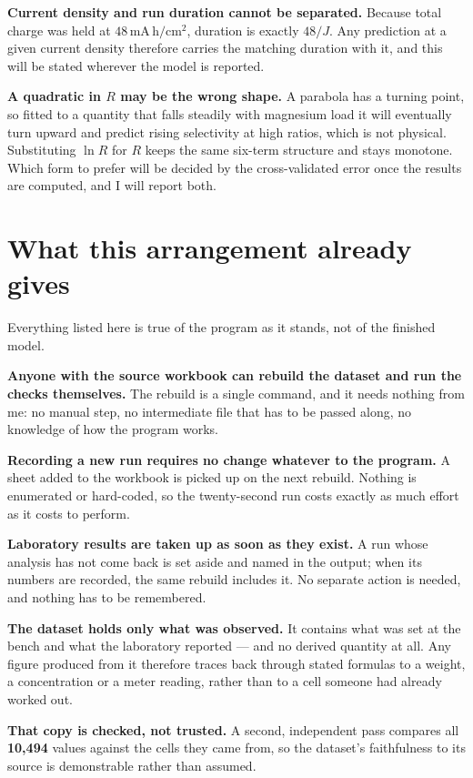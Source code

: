 \documentclass[11pt,a4paper]{article}
\newcommand{\unit}[1]{\,\mathrm{#1}}
\begin{document}
\textbf{Current density and run duration cannot be separated.} Because total charge was held
at $48\unit{mA\,h/cm^2}$, duration is exactly $48/J$. Any prediction at a given current
density therefore carries the matching duration with it, and this will be stated wherever the
model is reported.

\textbf{A quadratic in $R$ may be the wrong shape.} A parabola has a turning point, so fitted
to a quantity that falls steadily with magnesium load it will eventually turn upward and
predict rising selectivity at high ratios, which is not physical. Substituting $\ln R$ for $R$
keeps the same six-term structure and stays monotone. Which form to prefer will be decided by
the cross-validated error once the results are computed, and I will report both.

\section{What this arrangement already gives}

Everything listed here is true of the program as it stands, not of the finished model.

\textbf{Anyone with the source workbook can rebuild the dataset and run the checks
themselves.} The rebuild is a single command, and it needs nothing from me: no manual step, no
intermediate file that has to be passed along, no knowledge of how the program works.

\textbf{Recording a new run requires no change whatever to the program.} A sheet added to the
workbook is picked up on the next rebuild. Nothing is enumerated or hard-coded, so the twenty-second
run costs exactly as much effort as it costs to perform.

\textbf{Laboratory results are taken up as soon as they exist.} A run whose analysis has not
come back is set aside and named in the output; when its numbers are recorded, the same rebuild
includes it. No separate action is needed, and nothing has to be remembered.

\textbf{The dataset holds only what was observed.} It contains what was set at the bench and
what the laboratory reported --- and no derived quantity at all. Any figure produced from it
therefore traces back through stated formulas to a weight, a concentration or a meter reading,
rather than to a cell someone had already worked out.

\textbf{That copy is checked, not trusted.} A second, independent pass compares all
\textbf{10{,}494} values against the cells they came from, so the dataset's faithfulness to its
source is demonstrable rather than assumed.
\end{document}
